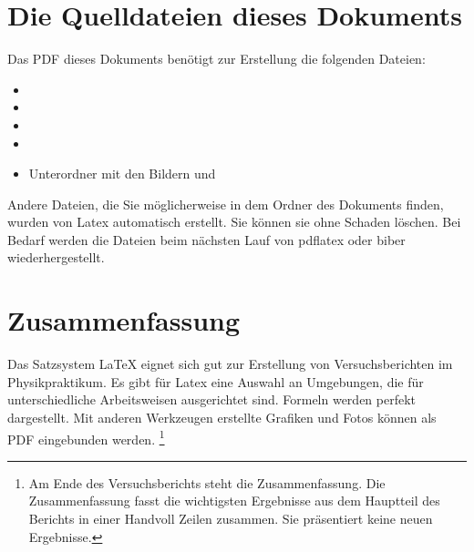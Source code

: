 \documentclass[ngerman]{scrartcl}
\begin{document}
\section{Die Quelldateien dieses Dokuments}
Das PDF dieses Dokuments benötigt zur Erstellung die folgenden Dateien:
\begin{itemize}
	\item {}
	\item {}
	\item {}
	\item {}
	\item Unterordner  mit den Bildern  und 
\end{itemize}
Andere Dateien, die Sie möglicherweise in dem Ordner des Dokuments finden, wurden von Latex automatisch erstellt. Sie können sie ohne Schaden löschen. Bei Bedarf werden die Dateien beim nächsten Lauf von pdflatex oder biber wiederhergestellt.


\section{Zusammenfassung}
Das Satzsystem \LaTeX{} eignet sich gut zur Erstellung von Versuchsberichten im Physikpraktikum. Es gibt für Latex eine Auswahl an Umgebungen, die für unterschiedliche Arbeitsweisen ausgerichtet sind. Formeln werden perfekt dargestellt. Mit anderen Werkzeugen erstellte Grafiken und Fotos können als PDF eingebunden werden.
\footnote{Am Ende des Versuchsberichts steht die Zusammenfassung. Die Zusammenfassung fasst die wichtigsten Ergebnisse aus dem Hauptteil des Berichts in einer Handvoll Zeilen zusammen. Sie präsentiert keine neuen Ergebnisse.}

\clearpage %
\printbibliography
\end{document}
